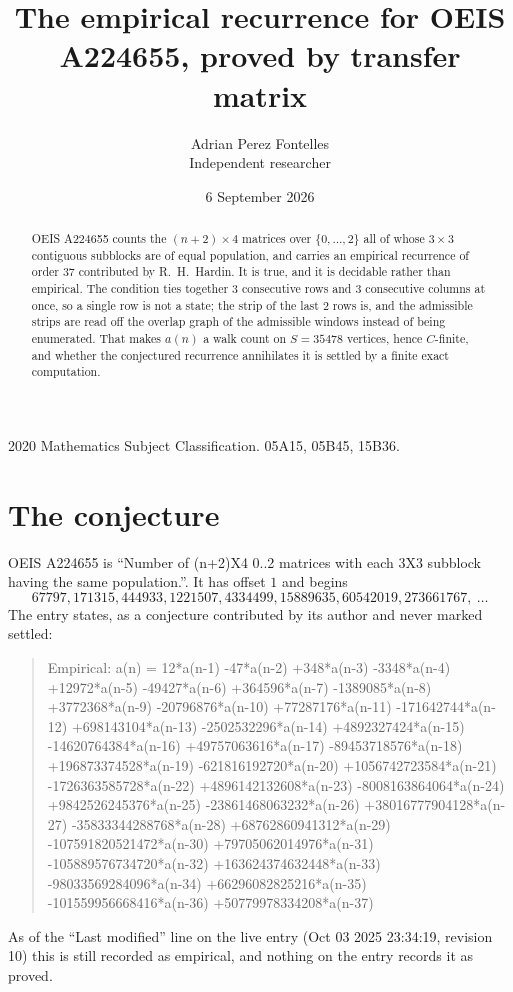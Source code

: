 \documentclass[11pt,a4paper]{article}
\title{The empirical recurrence for OEIS A224655, proved by transfer matrix}
\author{Adrian Perez Fontelles\\ \small Independent researcher}
\date{6 September 2026}
\theoremstyle{plain}
\theoremstyle{definition}
\begin{document}
\maketitle

\begin{abstract}
OEIS A224655 counts the $(n+2)\times4$ matrices over $\{0,\dots,2\}$ all of whose
$3\times3$ contiguous subblocks are of equal population, and carries an empirical recurrence of order
$37$ contributed by R.~H.~Hardin. It is true, and it is decidable rather than empirical.
The condition ties together $3$ consecutive rows and $3$ consecutive columns at once, so a
single row is not a state; the strip of the last $2$ rows is, and the admissible strips
are read off the overlap graph of the admissible windows instead of being enumerated. That
makes $a(n)$ a walk count on $S=35478$ vertices, hence $C$-finite, and whether the conjectured
recurrence annihilates it is settled by a finite exact computation.
\end{abstract}

\noindent\small 2020 Mathematics Subject Classification. 05A15, 05B45, 15B36.\normalsize

\section{The conjecture}

OEIS A224655 is ``Number of (n+2)X4 0..2 matrices with each 3X3 subblock having the same population.''. It has offset $1$ and begins
\[
67797, 171315, 444933, 1221507, 4334499, 15889635, 60542019, 273661767,\ \dots
\]
The entry states, as a conjecture contributed by its author and never marked settled:
\begin{quote}
Empirical: a(n) = 12*a(n-1) -47*a(n-2) +348*a(n-3) -3348*a(n-4) +12972*a(n-5) -49427*a(n-6) +364596*a(n-7) -1389085*a(n-8) +3772368*a(n-9) -20796876*a(n-10) +77287176*a(n-11) -171642744*a(n-12) +698143104*a(n-13) -2502532296*a(n-14) +4892327424*a(n-15) -14620764384*a(n-16) +49757063616*a(n-17) -89453718576*a(n-18) +196873374528*a(n-19) -621816192720*a(n-20) +1056742723584*a(n-21) -1726363585728*a(n-22) +4896142132608*a(n-23) -8008163864064*a(n-24) +9842526245376*a(n-25) -23861468063232*a(n-26) +38016777904128*a(n-27) -35833344288768*a(n-28) +68762860941312*a(n-29) -107591820521472*a(n-30) +79705062014976*a(n-31) -105889576734720*a(n-32) +163624374632448*a(n-33) -98033569284096*a(n-34) +66296082825216*a(n-35) -101559956668416*a(n-36) +50779978334208*a(n-37)
\end{quote}
As of the ``Last modified'' line on the live entry (Oct 03 2025 23:34:19, revision 10) this is still
recorded as empirical, and nothing on the entry records it as proved.
\end{document}
